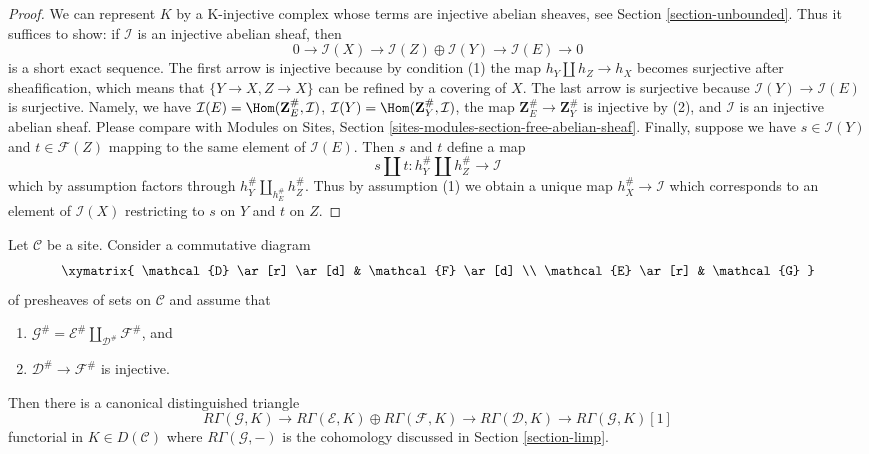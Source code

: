 \begin{proof}
We can represent $K$ by a K-injective complex whose terms are injective
abelian sheaves, see Section \ref{section-unbounded}.
Thus it suffices to show: if $\mathcal{I}$ is an injective abelian
sheaf, then
$$
0 \to \mathcal{I}(X) \to
\mathcal{I}(Z) \oplus \mathcal{I}(Y) \to
\mathcal{I}(E) \to 0
$$
is a short exact sequence. The first arrow is injective
because by condition (1) the map $h_Y \amalg h_Z \to h_X$
becomes surjective after sheafification, which means that
$\{Y \to X, Z \to X\}$ can be refined by a covering of $X$.
The last arrow is surjective because $\mathcal{I}(Y) \to \mathcal{I}(E)$
is surjective. Namely, we have
$\mathcal{I}(E) = \Hom(\mathbf{Z}_E^\#, \mathcal{I})$,
$\mathcal{I}(Y) = \Hom(\mathbf{Z}_Y^\#, \mathcal{I})$,
the map $\mathbf{Z}_E^\# \to \mathbf{Z}_Y^\#$ is injective
by (2), and $\mathcal{I}$ is an injective abelian sheaf.
Please compare with Modules on Sites, Section
\ref{sites-modules-section-free-abelian-sheaf}.
Finally, suppose we have $s \in \mathcal{I}(Y)$ and
$t \in \mathcal{F}(Z)$ mapping to the same element of
$\mathcal{I}(E)$. Then $s$ and $t$ define a map
$$
s \amalg t : h_Y^\# \amalg h_Z^\# \longrightarrow \mathcal{I}
$$
which by assumption factors through $h_Y^\# \amalg_{h_E^\#} h_Z^\#$.
Thus by assumption (1) we obtain a unique map
$h_X^\# \to \mathcal{I}$ which corresponds to an element
of $\mathcal{I}(X)$ restricting to $s$ on $Y$ and $t$ on $Z$.
\end{proof}

\begin{lemma}
\label{lemma-square-triangle-general}
Let $\mathcal{C}$ be a site. Consider a commutative diagram
$$
\xymatrix{
\mathcal{D} \ar[r] \ar[d] & \mathcal{F} \ar[d] \\
\mathcal{E} \ar[r] & \mathcal{G}
}
$$
of presheaves of sets on $\mathcal{C}$ and assume that
\begin{enumerate}
\item $\mathcal{G}^\# =
\mathcal{E}^\# \amalg_{\mathcal{D}^\#} \mathcal{F}^\#$, and
\item $\mathcal{D}^\# \to \mathcal{F}^\#$ is injective.
\end{enumerate}
Then there is a canonical distinguished triangle
$$
R\Gamma(\mathcal{G}, K) \to
R\Gamma(\mathcal{E}, K) \oplus
R\Gamma(\mathcal{F}, K) \to
R\Gamma(\mathcal{D}, K) \to
R\Gamma(\mathcal{G}, K)[1]
$$
functorial in $K \in D(\mathcal{C})$ where $R\Gamma(\mathcal{G}, -)$
is the cohomology discussed in Section \ref{section-limp}.
\end{lemma}

